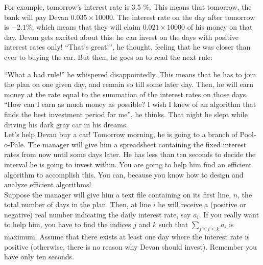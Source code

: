 \documentclass{article}
\begin{document}
\begin{center}
\end{center}

For example, tomorrow's interest rate is 3.5 \%. This means that tomorrow, the
bank will pay Devan $0.035 \times 10000$. The interest rate on the day after
tomorrow is $-2.1 \%$, which means that they will claim $0.021 \times 10000$
of his money on that day. Devan gets excited about this: he can invest on
the days with positive interest rates only! ``That's great!'', he thought,
feeling that he was closer than ever to buying the car. But then, he goes on
to read the next rule:
\begin{center}
\end{center}
``What a bad rule!'' he whispered disappointedly. This means that he has to
join the plan on one given day, and remain so till some later day. Then, he
will earn money at the rate equal to the summation of the interest rates on
those days. ``How can I earn  as much money as possible? I wish I knew of an
algorithm that finds the best investment period for me'', he thinks. That
night he slept while driving his dark gray car in his dreams.\\

Let's help Devan buy a car! Tomorrow morning, he is going to a branch of
Pool-o-Pale. The manager will give him a spreadsheet containing the fixed
interest rates from now until some days later. He has less than ten seconds
to decide the interval he is going to invest within. You are going to help
him find an efficient algorithm to accomplish this. You can, because you know
how to design and analyze efficient algorithms!  \\

Suppose the manager will give him a text file containing on its first line,
$n$, the total number of days in the plan. Then, at line $i$ he will receive
a (positive or negative) real number indicating the daily interest rate, say
$a_i$. If you really want to help him, you have to find the indices $j$ and
$k$ such that $\sum_{j \le i \le k} a_i$ is maximum. Assume that there exists
at least one day where the interest rate is positive (otherwise, there is no
reason why Devan should invest). Remember you have only ten seconds.\\
\end{document}
